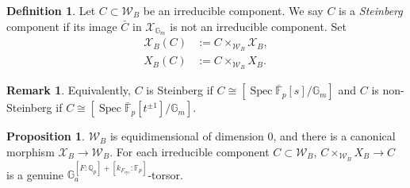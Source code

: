 \documentclass[11pt]{amsart}
\theoremstyle{definition}
\newtheorem{prop}[thm]{Proposition}
\newtheorem{defn}[thm]{Definition}
\newtheorem{remark}[thm]{Remark}
\newcommand{\Q}{\mathbb{Q}}
\newcommand{\G}{\mathbb{G}}
\newcommand{\F}{\mathbb{F}}
\newcommand{\bFp}{\bar{\mathbb{F}}_p}
\newcommand{\cX}{\mathcal{X}}
\newcommand{\cW}{\mathcal{W}}
\newcommand{\cyc}{{\operatorname{cyc}}}
\newcommand{\dkF}{[k_{F_{\cyc}}:\F_p]}
\newcommand{\dF}{[F:\Q_p]}
\DeclareMathOperator{\Spec}{Spec}
\begin{document}
\begin{defn}
\rm
Let $C\subset \cW_B$ be an irreducible component.
We say $C$ is a {\it Steinberg} component
if its image $\bar C$ in $\cX_{\G_m}$
is not an irreducible component.
Set 
\begin{align*}
\cX_{B}(C)&:=C\times_{\cW_B}\cX_B,
\\
X_{B}(C)&:=C\times_{\cW_B}X_B.
\end{align*}
\end{defn}

\begin{remark}
Equivalently, $C$ is Steinberg if
$C\cong [\Spec \bFp[s]/\G_m]$
and $C$ is non-Steinberg if
$C\cong [\Spec \bFp[t^{\pm1}]/\G_m]$.
\end{remark}

\begin{prop}
$\cW_B$ is equidimensional of dimension $0$,
and
there is a canonical morphism $\cX_B\to\cW_B$.
For each irreducible component $C\subset \cW_B$,
$C\times_{\cW_B}X_B\to C$
is a genuine $\G_a^{\dF+\dkF}$-torsor.
\label{prop:PGL2}
\end{prop}
\end{document}

